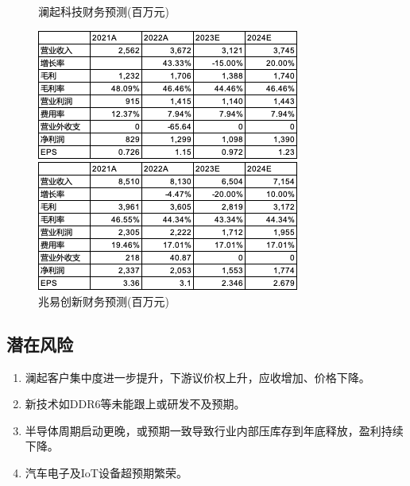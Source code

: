 \documentclass[a4paper,12pt]{ctexart}
\begin{document}
\begin{figure}[H]
    \begin{minipage}{0.48\linewidth}
        \caption{澜起科技财务预测(百万元)}
        \centering
        \includegraphics[width=\linewidth]{img/valuation-lq.png}
    \end{minipage}
    \begin{minipage}{0.48\linewidth}
        \caption{兆易创新财务预测(百万元)}
        \centering
        \includegraphics[width=\linewidth]{img/valuation-zy.png}
    \end{minipage}
\end{figure}
\subsection{潜在风险}
\begin{enumerate}
    \item 澜起客户集中度进一步提升，下游议价权上升，应收增加、价格下降。
    \item 新技术如DDR6等未能跟上或研发不及预期。
    \item 半导体周期启动更晚，或预期一致导致行业内部压库存到年底释放，盈利持续下降。
    \item 汽车电子及IoT设备超预期繁荣。
\end{enumerate}
\end{document}

